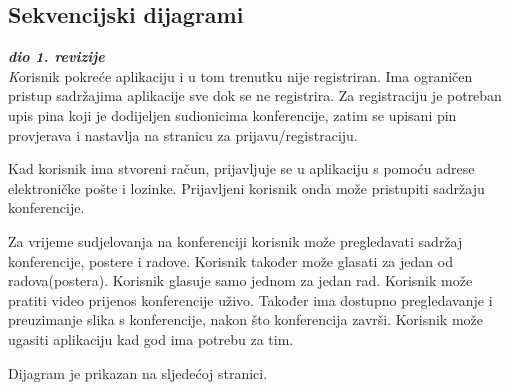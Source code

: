 			\subsection{Sekvencijski dijagrami}
				
				\textbf{\textit{dio 1. revizije}}\\
				
				\textit Korisnik pokreće aplikaciju i u tom trenutku nije registriran. Ima ograničen pristup sadržajima aplikacije sve dok se ne registrira. Za registraciju je potreban upis pina koji je dodijeljen sudionicima konferencije, zatim se upisani pin provjerava i nastavlja na stranicu za prijavu/registraciju.
				
				Kad korisnik ima stvoreni račun, prijavljuje se u aplikaciju s pomoću adrese elektroničke pošte i lozinke. Prijavljeni korisnik onda može pristupiti sadržaju konferencije. 
				
				Za vrijeme sudjelovanja na konferenciji korisnik može pregledavati sadržaj konferencije, postere i radove. Korisnik također može glasati za jedan od radova(postera). Korisnik glasuje samo jednom za jedan rad. Korisnik može pratiti video prijenos konferencije uživo. Također ima dostupno pregledavanje i preuzimanje slika s konferencije, nakon što konferencija završi. Korisnik može ugasiti aplikaciju kad god ima potrebu za tim.
				
				Dijagram je prikazan na sljedećoj stranici.
				\eject
				
